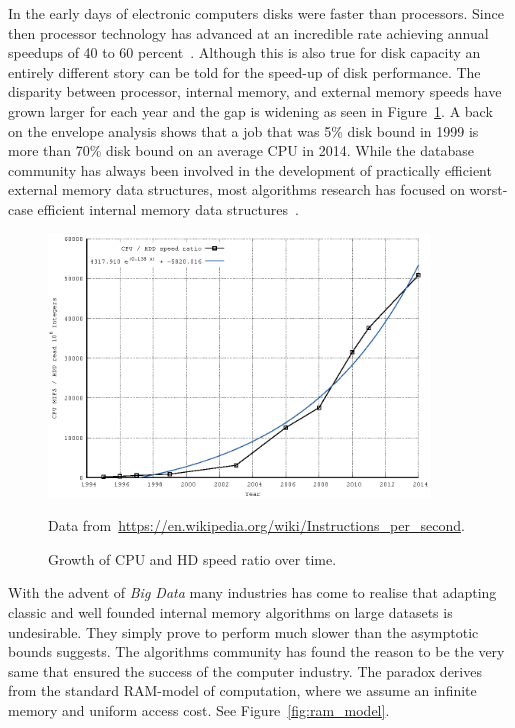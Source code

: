 \documentclass[twoside,11pt,openright]{report}
\begin{document}
In the early days of electronic computers disks were faster than processors. Since then processor technology has advanced at an incredible rate achieving annual speedups of 40 to 60 percent~\cite{ruemmler_wilkes_1994}. Although this is also true for disk capacity an entirely different story can be told for the speed-up of disk performance. The disparity between processor, internal memory, and external memory speeds have grown larger for each year and the gap is widening as seen in Figure~\ref{fig:cpu_vs_disk}. A back on the envelope analysis shows that a job that was 5\% disk bound in 1999 is more than 70\% disk bound on an average CPU in 2014. While the database community has always been involved in the development of practically efficient external memory data structures, most algorithms research has focused on worst-case efficient internal memory data structures~\cite{ionote}. 

\begin{figure}[h]
	\centering
		\includegraphics[width=0.9\textwidth]{../plots/scaling_discrepancy_hdd_cpu/scaling_discrepancy_hdd_cpu}
	\caption{Growth of CPU and HD speed ratio over time.}
	\tiny{Data from~\protect\url{https://en.wikipedia.org/wiki/Instructions_per_second}.}
	\label{fig:cpu_vs_disk}
\end{figure}

With the advent of \textit{Big Data} many industries has come to realise that adapting classic and well founded internal memory algorithms on large datasets is undesirable. 
They simply prove to perform much slower than the asymptotic bounds suggests. The algorithms community has found the reason to be the very same that ensured the success of the computer industry. The paradox derives from the standard RAM-model of computation, where we assume an infinite memory and uniform access cost. See Figure~\ref{fig:ram_model}.
\end{document}

